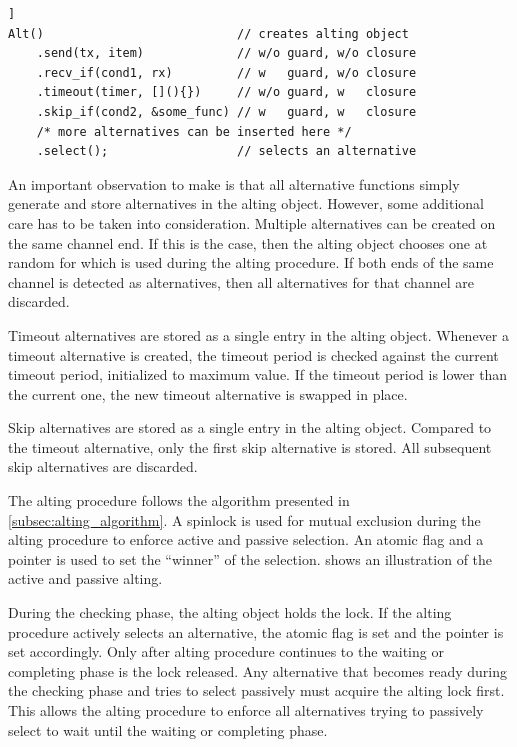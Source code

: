 \begin{lstfloat}
\begin{lstlisting}[caption={Code example of alting.}, label={lst:code_example_alting}, style={CustomC++}, xleftmargin={2em}]]
Alt()                           // creates alting object
    .send(tx, item)             // w/o guard, w/o closure
    .recv_if(cond1, rx)         // w   guard, w/o closure
    .timeout(timer, [](){})     // w/o guard, w   closure
    .skip_if(cond2, &some_func) // w   guard, w   closure
    /* more alternatives can be inserted here */
    .select();                  // selects an alternative
\end{lstlisting}
\end{lstfloat}

An important observation to make is that all alternative functions simply generate and store alternatives in the alting object. However, some additional care has to be taken into consideration. Multiple alternatives can be created on the same channel end. If this is the case, then the alting object chooses one at random for which is used during the alting procedure. If both ends of the same channel is detected as alternatives, then all alternatives for that channel are discarded.

Timeout alternatives are stored as a single entry in the alting object. Whenever a timeout alternative is created, the timeout period is checked against the current timeout period, initialized to maximum value. If the timeout period is lower than the current one, the new timeout alternative is swapped in place.

Skip alternatives are stored as a single entry in the alting object. Compared to the timeout alternative, only the first skip alternative is stored. All subsequent skip alternatives are discarded.

The alting procedure follows the algorithm presented in \cref{subsec:alting_algorithm}. A spinlock is used for mutual exclusion during the alting procedure to enforce active and passive selection. An atomic flag and a pointer is used to set the ``winner'' of the selection.  shows an illustration of the active and passive alting.

During the checking phase, the alting object holds the lock. If the alting procedure actively selects an alternative, the atomic flag is set and the pointer is set accordingly. Only after alting procedure continues to the waiting or completing phase is the lock released. Any alternative that becomes ready during the checking phase and tries to select passively must acquire the alting lock first. This allows the alting procedure to enforce all alternatives trying to passively select to wait until the waiting or completing phase. 

